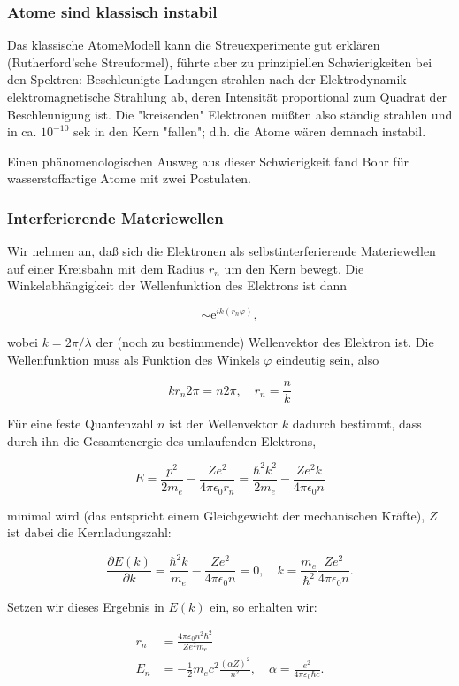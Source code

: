\documentclass[10pt, letterpaper]{article}
\begin{document}
\subsubsection*{Atome sind klassisch instabil}
Das klassische AtomeModell kann die Streuexperimente gut erklären (Rutherford'sche Streuformel), führte aber zu prinzipiellen Schwierigkeiten bei den Spektren: Beschleunigte Ladungen strahlen nach der Elektrodynamik elektromagnetische Strahlung ab, deren Intensität proportional zum Quadrat der Beschleunigung ist. Die "kreisenden" Elektronen müßten also ständig strahlen und in ca. $10^{-10}$ sek in den Kern "fallen"; d.h. die Atome wären demnach instabil.

Einen phänomenologischen Ausweg aus dieser Schwierigkeit fand Bohr für wasserstoffartige Atome mit zwei Postulaten.

\subsubsection*{Interferierende Materiewellen}
Wir nehmen an, daß sich die Elektronen als selbstinterferierende Materiewellen auf einer Kreisbahn mit dem Radius $r_{n}$ um den Kern bewegt. Die Winkelabhängigkeit der Wellenfunktion des Elektrons ist dann

$$
\sim \mathrm{e}^{i k\left(r_{n} \varphi\right)},
$$

wobei $k=2 \pi / \lambda$ der (noch zu bestimmende) Wellenvektor des Elektron ist. Die Wellenfunktion muss als Funktion des Winkels $\varphi$ eindeutig sein, also

$$
k r_{n} 2 \pi=n 2 \pi, \quad r_{n}=\frac{n}{k}
$$

Für eine feste Quantenzahl $n$ ist der Wellenvektor $k$ dadurch bestimmt, dass durch ihn die Gesamtenergie des umlaufenden Elektrons,

$$
E=\frac{p^{2}}{2 m_{e}}-\frac{Z e^{2}}{4 \pi \epsilon_{0} r_{n}}=\frac{\hbar^{2} k^{2}}{2 m_{e}}-\frac{Z e^{2} k}{4 \pi \epsilon_{0} n}
$$

minimal wird (das entspricht einem Gleichgewicht der mechanischen Kräfte), $Z$ ist dabei die Kernladungszahl:

$$
\frac{\partial E(k)}{\partial k}=\frac{\hbar^{2} k}{m_{e}}-\frac{Z e^{2}}{4 \pi \epsilon_{0} n}=0, \quad k=\frac{m_{e}}{\hbar^{2}} \frac{Z e^{2}}{4 \pi \epsilon_{0} n} .
$$

Setzen wir dieses Ergebnis in $E(k)$ ein, so erhalten wir:

$$
\begin{aligned}
r_{n} & =\frac{4 \pi \varepsilon_{0} n^{2} \hbar^{2}}{Z e^{2} m_{e}} \\
E_{n} & =-\frac{1}{2} m_{e} c^{2} \frac{(\alpha Z)^{2}}{n^{2}}, \quad \alpha=\frac{e^{2}}{4 \pi \varepsilon_{0} \hbar c} .
\end{aligned}
$$
\end{document}
